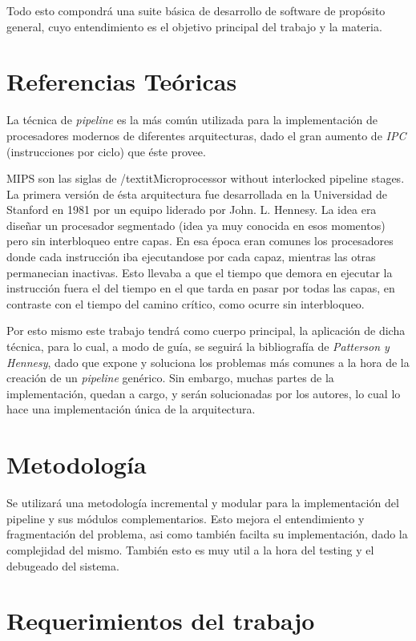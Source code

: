 \documentclass[12pt]{article}
\begin{document}
Todo esto compondrá una suite básica de desarrollo de software de propósito general, cuyo entendimiento es el objetivo principal del trabajo y la materia.


\section{Referencias Teóricas} \label{sec:firstpage}

La técnica de \textit{pipeline} es la más común utilizada para la implementación de procesadores modernos de diferentes arquitecturas, dado el gran aumento de \textit{IPC} (instrucciones por ciclo) que éste provee.

MIPS son las siglas de /textit{Microprocessor without interlocked pipeline stages}. La primera versión de ésta arquitectura fue desarrollada en la Universidad de Stanford en 1981 por un equipo liderado por John. L. Hennesy. La idea era diseñar un procesador segmentado (idea ya muy conocida en esos momentos) pero sin interbloqueo entre capas. En esa época eran comunes los procesadores donde cada instrucción iba ejecutandose por cada capaz, mientras las otras permanecian inactivas. Esto llevaba a que el tiempo que demora en ejecutar la instrucción fuera el del tiempo en el que tarda en pasar por todas las capas, en contraste con el tiempo del camino crítico, como ocurre sin interbloqueo. 

Por esto mismo este trabajo tendrá como cuerpo principal, la aplicación de dicha técnica, para lo cual, a modo de guía, se seguirá la bibliografía de \textit{Patterson y Hennesy}, dado que expone y soluciona los problemas más comunes a la hora de la creación de un \textit{pipeline} genérico. Sin embargo, muchas partes de la implementación, quedan a cargo, y serán solucionadas por los autores, lo cual lo hace una implementación única de la arquitectura.

\section{Metodología}

Se utilizará una metodología incremental y modular para la implementación del pipeline y sus módulos complementarios. Esto mejora el entendimiento y fragmentación del problema, asi como también facilta su implementación, dado la complejidad del mismo. También esto es muy util a la hora del testing y el debugeado del sistema.

\section{Requerimientos del trabajo}\label{sec:consigna}
\end{document}
